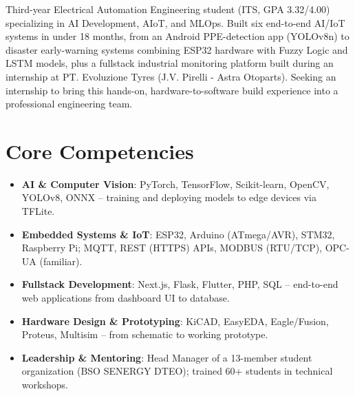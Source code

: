 \documentclass[11pt,a4paper,sans]{moderncv}
\begin{document}
\makecvtitle


\vspace{6pt}
\small{Third-year Electrical Automation Engineering student (ITS, GPA 3.32/4.00) specializing in AI Development, AIoT, and MLOps. Built six end-to-end AI/IoT systems in under 18 months, from an Android PPE-detection app (YOLOv8n) to disaster early-warning systems combining ESP32 hardware with Fuzzy Logic and LSTM models, plus a fullstack industrial monitoring platform built during an internship at PT. Evoluzione Tyres (J.V. Pirelli - Astra Otoparts). Seeking an internship to bring this hands-on, hardware-to-software build experience into a professional engineering team.}


\section{Core Competencies}
\vspace{1pt}
\begin{itemize}

\item \textbf{AI \& Computer Vision}: PyTorch, TensorFlow, Scikit-learn, OpenCV, YOLOv8, ONNX -- training and deploying models to edge devices via TFLite.

\item \textbf{Embedded Systems \& IoT}: ESP32, Arduino (ATmega/AVR), STM32, Raspberry Pi; MQTT, REST (HTTPS) APIs, MODBUS (RTU/TCP), OPC-UA (familiar).

\item \textbf{Fullstack Development}: Next.js, Flask, Flutter, PHP, SQL -- end-to-end web applications from dashboard UI to database.

\item \textbf{Hardware Design \& Prototyping}: KiCAD, EasyEDA, Eagle/Fusion, Proteus, Multisim -- from schematic to working prototype.

\item \textbf{Leadership \& Mentoring}: Head Manager of a 13-member student organization (BSO SENERGY DTEO); trained 60+ students in technical workshops.

\end{itemize}
\end{document}
